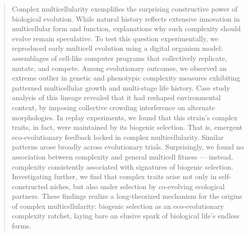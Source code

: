 \begin{abstract}
Complex multicellularity exemplifies the surprising constructive power of biological evolution.
While natural history reflects extensive innovation in multicellular form and function, explanations why such complexity should evolve remain speculative.
To test this question experimentally, we reproduced early multicell evolution using a digital organism model: assemblages of cell-like computer programs that collectively replicate, mutate, and compete.
Among evolutionary outcomes, we observed an extreme outlier in genetic and phenotypic complexity measures exhibiting patterned multicellular growth and multi-stage life history.
Case study analysis of this lineage revealed that it had reshaped environmental context, by imposing collective crowding interference on alternate morphologies.
In replay experiments, we found that this strain's complex traits, in fact, were maintained by its biogenic selection.
That is, emergent eco-evolutionary feedback locked in complex multicellularity.
Similar patterns arose broadly across evolutionary trials.
Surprisingly, we found no association between complexity and general multicell fitness --- instead, complexity consistently associated with signatures of biogenic selection.
Investigating further, we find that complex traits arise not only in self-constructed niches, but also under selection by co-evolving ecological partners.
These findings realize a long-theorized mechanism for the origins of complex multicellularity: biogenic selection as an eco-evolutionary complexity ratchet, laying bare an elusive spark of biological life's endless forms.
\end{abstract}
